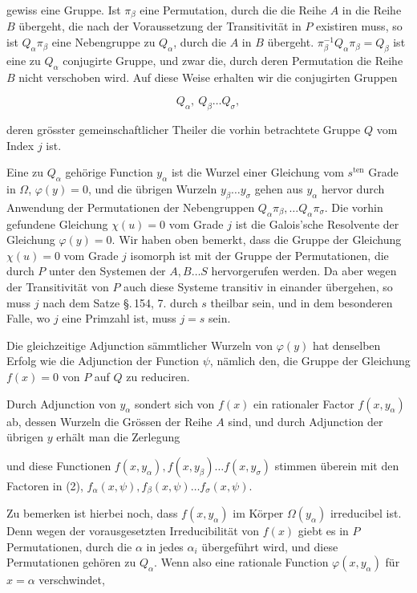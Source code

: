 
gewiss eine Gruppe. Ist $\pi_\beta$ eine Permutation, durch die
die Reihe $A$ in die Reihe $B$ übergeht, die nach der
Voraussetzung der Transitivität in $P$ existiren muss, so ist
$Q_\alpha \pi_\beta$ eine Nebengruppe zu $Q_\alpha$, durch die
$A$ in $B$ übergeht. $\pi_\beta^{-1} Q_\alpha \pi_\beta =
Q_\beta$ ist eine zu $Q_\alpha$ conjugirte Gruppe, und zwar die,
durch deren Permutation die Reihe $B$ nicht verschoben wird.
Auf diese Weise erhalten wir die conjugirten Gruppen

\[ Q_\alpha,\ Q_\beta \dots Q_\sigma, \]

deren grösster gemeinschaftlicher Theiler die vorhin
betrachtete Gruppe $Q$ vom Index $j$ ist.

Eine zu $Q_\alpha$ gehörige Function $y_\alpha$ ist die Wurzel
einer Gleichung vom $s^{\mathrm{ten}}$ Grade in $\Omega$,
$\varphi(y) = 0$, und die übrigen Wurzeln $y_\beta \dots y_\sigma$
gehen aus $y_\alpha$ hervor durch Anwendung der Permutationen
der Nebengruppen $Q_\alpha \pi_\beta, \dots Q_\alpha \pi_\sigma$.
Die vorhin gefundene Gleichung $\chi(u) = 0$ vom Grade $j$ ist
die Galois'sche Resolvente der Gleichung $\varphi(y) = 0$. Wir
haben oben bemerkt, dass die Gruppe der Gleichung $\chi(u) = 0$
vom Grade $j$ isomorph ist mit der Gruppe der Permutationen,
die durch $P$ unter den Systemen der $A, B \dots S$
hervorgerufen werden. Da aber wegen der Transitivität von $P$
auch diese Systeme transitiv in einander übergehen, so muss $j$
nach dem Satze \S.\,154, 7. durch $s$ theilbar sein, und in dem
besonderen Falle, wo $j$ eine Primzahl ist, muss $j = s$ sein.

Die gleichzeitige Adjunction sämmtlicher Wurzeln von $\varphi(y)$
hat denselben Erfolg wie die Adjunction der Function $\psi$,
nämlich den, die Gruppe der Gleichung $f(x) = 0$ von $P$ auf $Q$
zu reduciren.

Durch Adjunction von $y_\alpha$ sondert sich von $f(x)$ ein
rationaler Factor $f(x, y_\alpha)$ ab, dessen Wurzeln die
Grössen der Reihe $A$ sind, und durch Adjunction der übrigen $y$
erhält man die Zerlegung


und diese Functionen $f(x,y_\alpha), f(x,y_\beta) \dots
f(x,y_\sigma)$ stimmen überein mit den Factoren in (2),
$f_\alpha(x,\psi), f_\beta(x,\psi) \dots f_\sigma(x,\psi)$.

Zu bemerken ist hierbei noch, dass $f(x,y_\alpha)$ im Körper
$\Omega(y_\alpha)$ irreducibel ist. Denn wegen der
vorausgesetzten Irreducibilität von $f(x)$ giebt es in $P$
Permutationen, durch die $\alpha$ in jedes $\alpha_i$
übergeführt wird, und diese Permutationen gehören zu
$Q_\alpha$. Wenn also eine rationale Function $\varphi(x,
y_\alpha)$ für $x = \alpha$ verschwindet,
